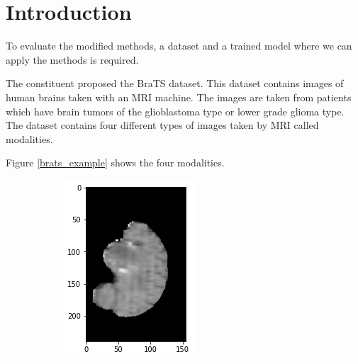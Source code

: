 \section{Introduction}
To evaluate the modified methods, a dataset and a trained model where we can apply the methods is required.

The constituent proposed the BraTS \cite{menze2015multimodal} dataset. This dataset contains
images of human brains taken with an MRI machine. The images are taken from patients which have brain tumors of the glioblastoma type or lower grade glioma type. The dataset contains four different types of images taken by MRI called modalities. 

Figure \ref{brats_example} shows the four modalities.

\begin{figure}[H]
    \centering
    \begin{subfigure}[t]{.2\textwidth}
        \centering
        \includegraphics[width=\linewidth]{chapters/04_segmentation/images/brats/0.png}

\end{subfigure}
\end{figure}
